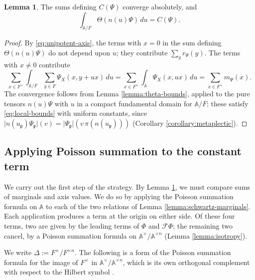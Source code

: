 \documentclass[reqno]{amsart}
\theoremstyle{plain}
\theoremstyle{definition}
\theoremstyle{itplain}
\newtheorem{lemma}[theorem]{Lemma}
\numberwithin{equation}{section}
\numberwithin{theorem}{section}
\begin{document}
\begin{lemma}\label{lemma:constant-term}
  The sums defining $C(\Psi)$ converge absolutely, and
  \begin{equation*}
    \int_{\mathbb{A} / F} \Theta(n(u) \Psi) \, d u = C(\Psi).
  \end{equation*}
\end{lemma}
\begin{proof}
  By \eqref{eq:unipotent-axis}, the terms with $x = 0$ in the sum defining $\Theta(n(u) \Psi)$ do not depend upon $u$; they contribute $\sum_{y} r_\Psi(y)$.  The terms with $x \neq 0$ contribute
  \begin{equation*}
    \sum_{x \in F^\times} \int_{\mathbb{A} / F} \sum_{y \in F} \Psi_X(x, y + u x) \, d u
    = \sum_{x \in F^\times} \int_{\mathbb{A}} \Psi_X(x, u x) \, d u
    = \sum_{x \in F^\times} m_\Psi(x).
  \end{equation*}
  The convergence follows from Lemma \ref{lemma:theta-bounds}, applied to the pure tensors $n(u) \Psi$ with $u$ in a compact fundamental domain for $\mathbb{A} / F$; these satisfy \eqref{eq:local-bounds} with uniform constants, since $\lvert n(u_{\mathfrak{p}}) \Psi_{\mathfrak{p}} \rvert(v) = \lvert \Psi_{\mathfrak{p}} \rvert(v \, \pi(n(u_{\mathfrak{p}})))$ (Corollary \ref{corollary:metaplectic}).
\end{proof}

\subsection{Applying Poisson summation to the constant term}\label{sec:constant-terms}
We carry out the first step of the strategy.  By Lemma \ref{lemma:constant-term}, we must compare sums of marginals and axis values.  We do so by applying the Poisson summation formula on $\mathbb{A}$ to each of the two relations of Lemma \ref{lemma:schwartz-marginals}.  Each application produces a term at the origin on either side.  Of these four terms, two are given by the leading terms of $\Phi$ and $\mathcal{F} \Phi$; the remaining two cancel, by a Poisson summation formula on $\mathbb{A}^\times / \mathbb{A}^{\times n}$ (Lemma \ref{lemma:isotropy}).

We write $\Delta := F^\times / F^{\times n}$.  The following is a form of the Poisson summation formula for the image of $F^\times$ in $\mathbb{A}^\times / \mathbb{A}^{\times n}$, which is its own orthogonal complement with respect to the Hilbert symbol \cite[XIII.5, Proposition 8]{MR0427267}.
\end{document}
